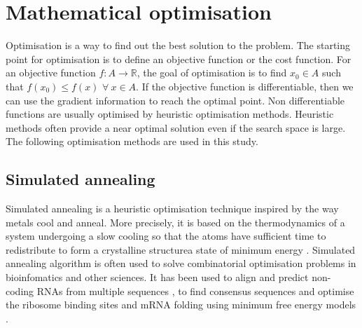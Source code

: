 \section{Mathematical optimisation}
Optimisation is a way to find out the best solution to the problem. The starting point for optimisation is to define an objective function or the cost function. For an objective function $f: A \rightarrow  \mathbb{R}$, the goal of optimisation is to find $x_0 \in A$ such that $f(x_0) \leq f(x)$ $\forall\ x \in A$. If the objective function is differentiable, then we can use the gradient information to reach the optimal point. Non differentiable functions are usually optimised by heuristic optimisation methods. Heuristic methods often provide a near optimal solution even if the search space is large. The following optimisation methods are used in this study.


\subsection{Simulated annealing}
\label{subsection:sim_anneal}
Simulated annealing is a heuristic optimisation technique inspired by the way metals cool and anneal. More precisely, it is based on the thermodynamics of a system undergoing a slow cooling so that the atoms have sufficient time to redistribute to form a crystalline structure\textemdash a state of minimum energy  \cite{Kirkpatrick1983-hh, Ingber2000-aw, Keith2002-jx, Brownlee2011-bk, presse1988numerical}. Simulated annealing algorithm is often used to solve combinatorial optimisation problems in bioinfomatics and other sciences. It has been used to align and predict non-coding RNAs from multiple sequences \cite{Lindgreen2007-jy}, to find consensus sequences \cite{Keith2002-jx} and optimise the ribosome binding sites \cite{Salis2009-dh} and mRNA folding using minimum free energy models \cite{Gaspar2013-bg}.

